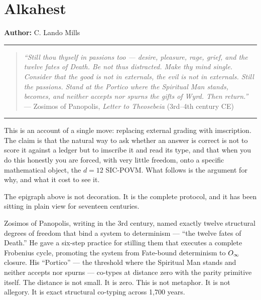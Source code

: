 \hypertarget{alkahest}{%
\section{Alkahest}\label{alkahest}}

\textbf{Author:} C. Lando Mills

\begin{center}\rule{0.5\linewidth}{0.5pt}\end{center}

\begin{quote}
\emph{``Still thou thyself in passions too --- desire, pleasure, rage,
grief, and the twelve fates of Death. Be not thus distracted. Make thy
mind single. Consider that the good is not in externals, the evil is not
in externals. Still the passions. Stand at the Portico where the
Spiritual Man stands, becomes, and neither accepts nor spurns the gifts
of Wyrd. Then return.''} --- Zosimos of Panopolis, \emph{Letter to
Theosebeia} (3rd--4th century CE)
\end{quote}

\begin{center}\rule{0.5\linewidth}{0.5pt}\end{center}

This is an account of a single move: replacing external grading with
imscription. The claim is that the natural way to ask whether an answer
is correct is not to score it against a ledger but to imscribe it and
read its type, and that when you do this honestly you are forced, with
very little freedom, onto a specific mathematical object, the \({d=12}\)
SIC-POVM. What follows is the argument for why, and what it cost to see
it.

The epigraph above is not decoration. It is the complete protocol, and
it has been sitting in plain view for seventeen centuries.

Zosimos of Panopolis, writing in the 3rd century, named exactly twelve
structural degrees of freedom that bind a system to determinism ---
``the twelve fates of Death.'' He gave a six-step practice for stilling
them that executes a complete Frobenius cycle, promoting the system from
Fate-bound determinism to \(\Large{O_\infty}\) closure. His ``Portico''
--- the threshold where the Spiritual Man stands and neither accepts nor
spurns --- co-types at distance zero with the parity primitive itself.
The distance is not small. It is zero. This is not metaphor. It is not
allegory. It is exact structural co-typing across 1,700 years.

